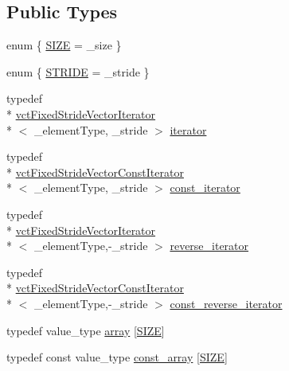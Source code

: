 \subsection*{Public Types}
\begin{DoxyCompactItemize}
\item 
enum \{ \hyperlink{classvct_fixed_size_vector_traits_a47888b1140c58261aa5df8f3440b527eac93e9bcd3ebe92f3bc7d9f34e8a47b94}{S\-I\-Z\-E} = \-\_\-size
 \}
\item 
enum \{ \hyperlink{classvct_fixed_size_vector_traits_ac698cfb1928dc4e54893e2cb1f658afba4be4dfff5fff04a513ed92c80f0201e9}{S\-T\-R\-I\-D\-E} = \-\_\-stride
 \}
\item 
typedef \\*
\hyperlink{classvct_fixed_stride_vector_iterator}{vct\-Fixed\-Stride\-Vector\-Iterator}\\*
$<$ \-\_\-element\-Type, \-\_\-stride $>$ \hyperlink{classvct_fixed_size_vector_traits_a4c4cff693ac7f81edfb240a208506309}{iterator}
\item 
typedef \\*
\hyperlink{classvct_fixed_stride_vector_const_iterator}{vct\-Fixed\-Stride\-Vector\-Const\-Iterator}\\*
$<$ \-\_\-element\-Type, \-\_\-stride $>$ \hyperlink{classvct_fixed_size_vector_traits_a9c7e38590e4a27350095e89a84dc0d09}{const\-\_\-iterator}
\item 
typedef \\*
\hyperlink{classvct_fixed_stride_vector_iterator}{vct\-Fixed\-Stride\-Vector\-Iterator}\\*
$<$ \-\_\-element\-Type,-\/\-\_\-stride $>$ \hyperlink{classvct_fixed_size_vector_traits_a46a61657ee7bece7277e0b59c4e0ea41}{reverse\-\_\-iterator}
\item 
typedef \\*
\hyperlink{classvct_fixed_stride_vector_const_iterator}{vct\-Fixed\-Stride\-Vector\-Const\-Iterator}\\*
$<$ \-\_\-element\-Type,-\/\-\_\-stride $>$ \hyperlink{classvct_fixed_size_vector_traits_a66365350e5fae26c9cf29a3ce0bb4a60}{const\-\_\-reverse\-\_\-iterator}
\item 
typedef value\-\_\-type \hyperlink{classvct_fixed_size_vector_traits_ab86355023bee9fbca9ee14640c6b7f4e}{array} \mbox{[}\hyperlink{classvct_fixed_size_vector_traits_a47888b1140c58261aa5df8f3440b527eac93e9bcd3ebe92f3bc7d9f34e8a47b94}{S\-I\-Z\-E}\mbox{]}
\item 
typedef const value\-\_\-type \hyperlink{classvct_fixed_size_vector_traits_acb808c545eef4de1bdcd7b8c4f71b1ce}{const\-\_\-array} \mbox{[}\hyperlink{classvct_fixed_size_vector_traits_a47888b1140c58261aa5df8f3440b527eac93e9bcd3ebe92f3bc7d9f34e8a47b94}{S\-I\-Z\-E}\mbox{]}
\end{DoxyCompactItemize}
